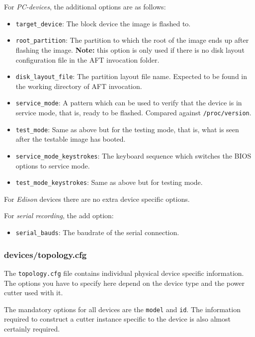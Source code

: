 \documentclass[a4paper,11pt]{article}
\newcommand{\note}{\textbf{Note: }}
\newcommand{\cmd}[1]{\texttt{#1}}
\begin{document}
For \emph{PC-devices}, the additional options are as follows:
\begin{itemize}
\item \cmd{target\_device}: The block device the image is flashed to.

\item \cmd{root\_partition}: The partition to which the root of the image ends up after flashing the image. \note this option is only used if there is no disk layout configuration file in the AFT invocation folder.

\item \cmd{disk\_layout\_file}: The partition layout file name. Expected to be found in the working directory of AFT invocation.

\item \cmd{service\_mode}: A pattern which can be used to verify that the device is in service mode, that is, ready to be flashed. Compared against \cmd{/proc/version}.

\item \cmd{test\_mode}: Same as above but for the testing mode, that is, what is seen after the testable image has booted.

\item \cmd{service\_mode\_keystrokes}: The keyboard sequence which switches the BIOS options to service mode.

\item \cmd{test\_mode\_keystrokes}: Same as above but for testing mode.
\end{itemize}

For \emph{Edison} devices there are no extra device specific options.

For \emph{serial recording}, the add option:
\begin{itemize}
	\item \cmd{serial\_bauds}: The baudrate of the serial connection.
\end{itemize}

\subsubsection*{devices/topology.cfg}

The \cmd{topology.cfg} file contains individual physical device specific information. The options you have to specify here depend on the device type and the power cutter used with it.

The mandatory options for all devices are the \cmd{model} and \cmd{id}. The information required to construct a cutter instance specific to the device is also almost certainly required.
\end{document}
